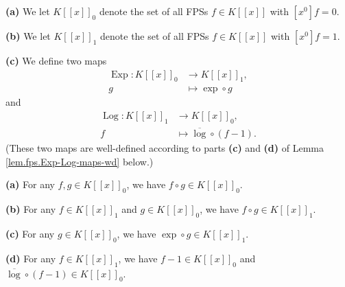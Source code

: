 \begin{definition}
\label{def.fps.Exp-Log-maps}
\leantarget
\leanok
\textbf{(a)} We let $K\left[\left[x\right]
\right]_{0}$ denote the set of all FPSs $f\in K\left[\left[x\right]
\right]$ with $\left[x^{0}\right]f=0$. \medskip

\textbf{(b)} We let $K\left[\left[x\right]\right]_{1}$ denote the set
of all FPSs $f\in K\left[\left[x\right]\right]$ with $\left[
x^{0}\right]f=1$. \medskip

\textbf{(c)} We define two maps
\begin{align*}
\operatorname{Exp}:K\left[\left[x\right]\right]_{0} &  \rightarrow
K\left[\left[x\right]\right]_{1},\\
g &  \mapsto\exp\circ g
\end{align*}
and
\begin{align*}
\operatorname{Log}:K\left[\left[x\right]\right]_{1} &  \rightarrow
K\left[\left[x\right]\right]_{0},\\
f &  \mapsto\overline{\log}\circ\left(f-1\right).
\end{align*}
(These two maps are well-defined according to parts \textbf{(c)} and
\textbf{(d)} of Lemma \ref{lem.fps.Exp-Log-maps-wd} below.)
\end{definition}

\begin{lemma}
\label{lem.fps.Exp-Log-maps-wd}
\leantarget
\leanok
\textbf{(a)} For any $f,g\in K\left[\left[
x\right]\right]_{0}$, we have $f\circ g\in K\left[\left[x\right]
\right]_{0}$. \medskip

\textbf{(b)} For any $f\in K\left[\left[x\right]\right]_{1}$ and $g\in
K\left[\left[x\right]\right]_{0}$, we have $f\circ g\in K\left[
\left[x\right]\right]_{1}$. \medskip

\textbf{(c)} For any $g\in K\left[\left[x\right]\right]_{0}$, we have
$\exp\circ g\in K\left[\left[x\right]\right]_{1}$. \medskip

\textbf{(d)} For any $f\in K\left[\left[x\right]\right]_{1}$, we have
$f-1\in K\left[\left[x\right]\right]_{0}$ and $\overline{\log}
\circ\left(f-1\right)\in K\left[\left[x\right]\right]_{0}$.
\end{lemma}


